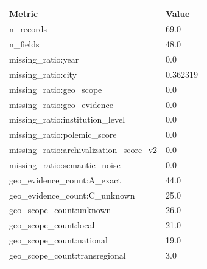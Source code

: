 \begin{tabular}{ll}
\hline
Metric & Value \\
\hline
n\_records & 69.0 \\
n\_fields & 48.0 \\
missing\_ratio:year & 0.0 \\
missing\_ratio:city & 0.362319 \\
missing\_ratio:geo\_scope & 0.0 \\
missing\_ratio:geo\_evidence & 0.0 \\
missing\_ratio:institution\_level & 0.0 \\
missing\_ratio:polemic\_score & 0.0 \\
missing\_ratio:archivalization\_score\_v2 & 0.0 \\
missing\_ratio:semantic\_noise & 0.0 \\
geo\_evidence\_count:A\_exact & 44.0 \\
geo\_evidence\_count:C\_unknown & 25.0 \\
geo\_scope\_count:unknown & 26.0 \\
geo\_scope\_count:local & 21.0 \\
geo\_scope\_count:national & 19.0 \\
geo\_scope\_count:transregional & 3.0 \\
\hline
\end{tabular}
